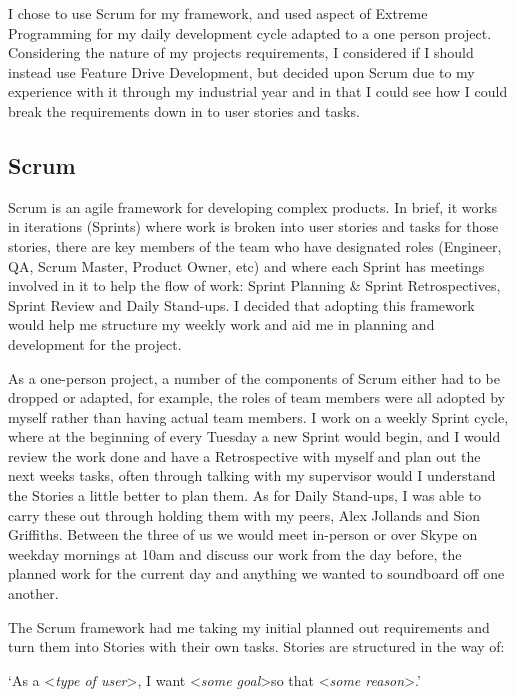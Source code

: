 I chose to use Scrum for my framework, and used aspect of Extreme Programming for my daily development cycle adapted to a one person project. Considering the  nature of my projects requirements, I considered if I should instead use Feature Drive Development, but decided upon Scrum due to my experience with it through my industrial year and in that I could see how I could break the requirements down in to user stories and tasks.

\subsection{Scrum}
Scrum is an agile framework for developing complex products\cite{Schw01a}. In brief, it works in iterations (Sprints) where work is broken into user stories and tasks for those stories, there are key members of the team who have designated roles (Engineer, QA, Scrum Master, Product Owner, etc) and where each Sprint has meetings involved in it to help the flow of work: Sprint Planning \& Sprint Retrospectives, Sprint Review and Daily Stand-ups. I decided that adopting this framework would help me structure my weekly work and aid me in planning and development for the project.

As a one-person project, a number of the components of Scrum either had to be dropped or adapted, for example, the roles of team members were all adopted by myself rather than having actual team members. I work on a weekly Sprint cycle, where at the beginning of every Tuesday a new Sprint would begin, and I would review the work done and have a Retrospective with myself and plan out the next weeks tasks, often through talking with my supervisor would I understand the Stories a little better to plan them. As for Daily Stand-ups, I was able to carry these out through holding them with my peers, Alex Jollands and Sion Griffiths. Between the three of us we would meet in-person or over Skype on weekday mornings at 10am and discuss our work from the day before, the planned work for the current day and anything we wanted to soundboard off one another.


The Scrum framework had me taking my initial planned out requirements and turn them into Stories with their own tasks. Stories are structured in the way of:
\newline

`As a \textless \textit{type of user}\textgreater, I want \textless \textit{some goal}\textgreater so that \textless \textit{some reason}\textgreater.'\cite{userstories}
\newline

